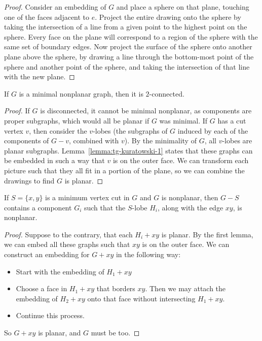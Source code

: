 \begin{proof}
  Consider an embedding of $G$ and place a sphere on that plane, touching one of
  the faces adjacent to $e$.
  Project the entire drawing onto the sphere by taking the intersection of a
  line from a given point to the highest point on the sphere.
  Every face on the plane will correspond to a region of the sphere with the
  same set of boundary edges.
  Now project the surface of the sphere onto another plane above the sphere, by
  drawing a line through the bottom-most point of the sphere and another point
  of the sphere, and taking the intersection of that line with the new plane.
\end{proof}


\begin{lemma}
  \label{lemma:tg-kuratowski-2}
  If $G$ is a minimal nonplanar graph, then it is $2$-connected.
\end{lemma}

\begin{proof}
  If $G$ is disconnected, it cannot be minimal nonplanar, as components are
  proper subgraphs, which would all be planar if $G$ was minimal.
  If $G$ has a cut vertex $v$, then consider the $v$-lobes (the subgraphs of $G$
  induced by each of the components of $G-v$, combined with $v$).
  By the minimality of $G$, all $v$-lobes are planar subgraphs.
  Lemma~\ref{lemma:tg-kuratowski-1} states that these graphs can be embedded in
  such a way that $v$ is on the outer face.
  We can transform each picture such that they all fit in a portion of the
  plane, so we can combine the drawings to find $G$ is planar.
\end{proof}


\begin{lemma}
  \label{lemma:tg-kuratowski-3}
  If $S= \{x,y\}$ is a minimum vertex cut in $G$ and $G$ is nonplanar, then
  $G-S$ contains a component $G_i$ such that the $S$-lobe $H_i$, along with the
  edge $xy$, is nonplanar.
\end{lemma}

\begin{proof}
  Suppose to the contrary, that each $H_i + xy$ is planar.
  By the first lemma, we can embed all these graphs such that $xy$ is on the
  outer face.
  We can construct an embedding for $G+xy$ in the following way:
  \begin{itemize}
  \item Start with the embedding of $H_1 + xy$
  \item Choose a face in $H_1 + xy$ that borders $xy$.
	Then we may attach the embedding of $H_2 + xy$ onto that face without
	intersecting $H_1 + xy$.
  \item Continue this process.
  \end{itemize}
  So $G + xy$ is planar, and $G$ must be too.
\end{proof}


